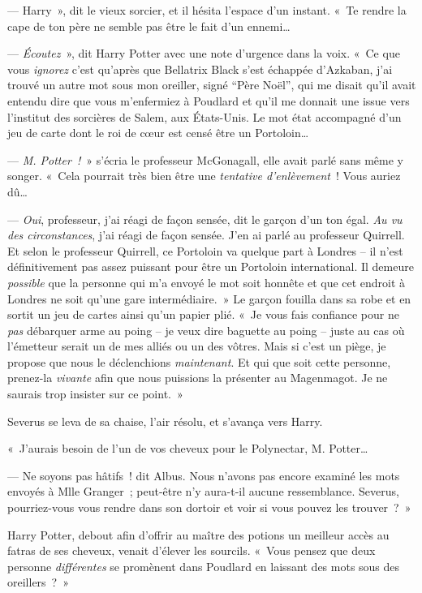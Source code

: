 --- Harry~», dit le vieux sorcier, et il hésita l'espace d'un instant. «~Te rendre la cape de ton père ne semble pas être le fait d'un ennemi…

--- \emph{Écoutez}~», dit Harry Potter avec une note d'urgence dans la voix. «~Ce que vous \emph{ignorez} c'est qu'après que Bellatrix Black s'est échappée d'Azkaban, j'ai trouvé un autre mot sous mon oreiller, signé “Père Noël”, qui me disait qu'il avait entendu dire que vous m'enfermiez à Poudlard et qu'il me donnait une issue vers l'institut des sorcières de Salem, aux États-Unis. Le mot état accompagné d'un jeu de carte dont le roi de cœur est censé être un Portoloin…

--- \emph{M. Potter~!}~» s'écria le professeur McGonagall, elle avait parlé sans même y songer. «~Cela pourrait très bien être une \emph{tentative d'enlèvement}~! Vous auriez dû…

--- \emph{Oui}, professeur, j'ai réagi de façon sensée, dit le garçon d'un ton égal. \emph{Au vu des circonstances}, j'ai réagi de façon sensée. J'en ai parlé au professeur Quirrell. Et selon le professeur Quirrell, ce Portoloin va quelque part à Londres -- il n'est définitivement pas assez puissant pour être un Portoloin international. Il demeure \emph{possible} que la personne qui m'a envoyé le mot soit honnête et que cet endroit à Londres ne soit qu'une gare intermédiaire.~» Le garçon fouilla dans sa robe et en sortit un jeu de cartes ainsi qu'un papier plié. «~Je vous fais confiance pour ne \emph{pas} débarquer arme au poing -- je veux dire baguette au poing -- juste au cas où l'émetteur serait un de mes alliés ou un des vôtres. Mais si c'est un piège, je propose que nous le déclenchions \emph{maintenant}. Et qui que soit cette personne, prenez-la \emph{vivante} afin que nous puissions la présenter au Magenmagot. Je ne saurais trop insister sur ce point.~»

Severus se leva de sa chaise, l'air résolu, et s'avança vers Harry.

«~J'aurais besoin de l'un de vos cheveux pour le Polynectar, M. Potter…

--- Ne soyons pas hâtifs~! dit Albus. Nous n'avons pas encore examiné les mots envoyés à Mlle Granger~; peut-être n'y aura-t-il aucune ressemblance. Severus, pourriez-vous vous rendre dans son dortoir et voir si vous pouvez les trouver~?~»

Harry Potter, debout afin d'offrir au maître des potions un meilleur accès au fatras de ses cheveux, venait d'élever les sourcils. «~Vous pensez que deux personne \emph{différentes} se promènent dans Poudlard en laissant des mots sous des oreillers~?~»

